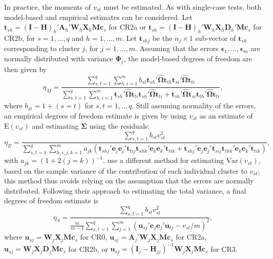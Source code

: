 \documentclass[12pt]{article}\usepackage[]{graphicx}\usepackage[]{color}
\newcommand{\E}{\text{E}}
\newcommand{\Var}{\text{Var}}
\newcommand{\bm}{\mathbf}
\newcommand{\bs}{\boldsymbol}
\begin{document}
In practice, the moments of $v_{st}$ must be estimated. 
As with single-case tests, both model-based and empirical estimates can be considered.
Let $\bm{t}_{sh} = \left(\bm{I} - \bm{H}\right)_h'\bm{A}_h'\bm{W}_h\bm{X}_h\bm{M}\bm{c}_s$ for CR2a or $\bm{t}_{sh} = \left(\bm{I} - \bm{H}\right)_h'\bm{W}_h\bm{X}_h\bm{D}_h'\bm{M}\bm{c}_s$ for CR2b, for $s = 1,...,q$ and $h = 1,...,m$. 
Let $\bm{t}_{shj}$ be the $n_j \times 1$ sub-vector of $\bm{t}_{sh}$ corresponding to cluster $j$, for $j = 1,...,m$. Assuming that the errors $\bs\epsilon_1,...,\bs\epsilon_m$ are normally distributed with variance $\bs\Phi_j$, the model-based degrees of freedom are then given by
\begin{equation}
\label{eq:eta_model}
\eta_M = \frac{\sum_{s,t=1}^q \sum_{h,i=1}^m b_{st} \bm{t}_{sh}'\hat{\bs\Omega}\bm{t}_{th} \bm{t}_{si}'\hat{\bs\Omega}\bm{t}_{ti}}{\sum_{s,t=1}^q \sum_{h,i=1}^m \bm{t}_{sh}'\hat{\bs\Omega}\bm{t}_{ti} \bm{t}_{sh}'\hat{\bs\Omega}\bm{t}_{ti} + \bm{t}_{sh}'\hat{\bs\Omega}\bm{t}_{si} \bm{t}_{th}'\hat{\bs\Omega}\bm{t}_{ti}},
\end{equation}
where $b_{st} = 1 + (s=t)$ for $s,t=1,..,q$.
Still assuming normality of the errors, an empirical degrees of freedom estimate is given by using $v_{st}$ as an estimate of $\E\left(v_{st}\right)$ and estimating $\bs\Sigma$ using the residuals: 
\begin{equation}
\label{eq:eta_empirical}
\eta_E = \frac{\sum_{s,t=1}^q b_{st} v_{st}^2}{\sum_{s,t=1}^q \sum_{h,i,j,k=1}^m a_{jk}\left(\bm{t}_{shj}'\bm{e}_j \bm{e}_j'\bm{t}_{tij} \bm{t}_{shk}' \bm{e}_k \bm{e}_k' \bm{t}_{tik} + \bm{t}_{shj}'\bm{e}_j \bm{e}_j'\bm{t}_{sij} \bm{t}_{thk}' \bm{e}_k \bm{e}_k' \bm{t}_{tik}\right)},
\end{equation}
with $a_{jk} = \left(1 + 2(j=k)\right)^{-1}$.
\cite{Pan2002small} use a different method for estimating $\Var(v_{st})$, based on the sample variance of the contribution of each individual cluster to $v_{st}$; this method thus avoids relying on the assumption that the errors are normally distributed. 
Following their approach to estimating the total variance, a final degrees of freedom estimate is
\begin{equation}
\label{eq:eta_sample}
\eta_S = \frac{\sum_{s,t=1}^q b_{st} v_{st}^2}{\frac{m}{m-1}\sum_{s,t=1}^q \sum_{j=1}^m \left(\bm{u}_{sj}'\bm{e}_j \bm{e}_j'\bm{u}_{tj} - v_{st} / m\right)^2},
\end{equation}
where $\bm{u}_{sj} = \bm{W}_j \bm{X}_j \bm{M}\bm{c}_s$ for CR0, $\bm{u}_{sj} = \bm{A}_j'\bm{W}_j \bm{X}_j \bm{M}\bm{c}_s$ for CR2a, $\bm{u}_{sj} = \bm{W}_j \bm{X}_j \bm{D}_j \bm{M}\bm{c}_s$ for CR2b, or $\bm{u}_{sj} = \left(\bm{I}_j - \bm{H}_{jj}\right)^{-1} \bm{W}_j \bm{X}_j \bm{M}\bm{c}_s$ for CR3.
\end{document}
